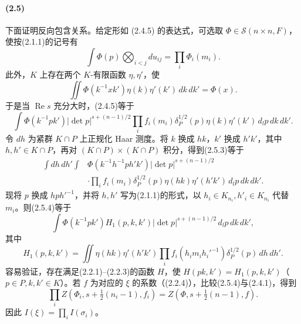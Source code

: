 \paragraph*{(2.5)} 下面证明反向包含关系。给定形如 (2.4.5) 的表达式，可选取 $\Phi\in\mathcal S(n\times n,F)$，使按(2.1.1)的记号有
\begin{equation}
 \int\Phi(p)\bigotimes_{i<j}du_{ij}=\prod_i\Phi_i(m_i).\tag{2.5.1}
\end{equation}
此外，$K$ 上存在两个 $K$-有限函数 $\eta,\eta'$，使
\begin{equation}
 \iint\Phi(k^{-1}xk')\eta(k)\eta'(k')\,dk\,dk'=\Phi(x).\tag{2.5.2}
\end{equation}
于是当 $\operatorname{Re}s$ 充分大时，(2.4.5)等于
\begin{equation}
 \int\Phi(k^{-1}pk')|\det p|^{s+(n-1)/2}
 \prod_if_i(m_i)\delta_P^{1/2}(p)\eta(k)\eta'(k')\,d_lp\,dk\,dk'.\tag{2.5.3}
\end{equation}
令 $dh$ 为紧群 $K\cap P$ 上正规化 Haar 测度。将 $k$ 换成 $hk$，$k'$ 换成 $h'k'$，其中 $h,h'\in K\cap P$，再对 $(K\cap P)\times(K\cap P)$ 积分，得到(2.5.3)等于
\begin{equation}
\begin{aligned}
 \int dh\,dh'\int&\Phi(k^{-1}h^{-1}ph'k')|\det p|^{s+(n-1)/2}\\
 &\cdot\prod_i f_i(m_i)\delta_P^{1/2}(p)\eta(hk)\eta'(h'k')\,d_lp\,dk\,dk'.
\end{aligned}\tag{2.5.4}
\end{equation}
现将 $p$ 换成 $hph'^{-1}$，并将 $h,h'$ 写为(2.1.1)的形式，以 $h_i\in K_{n_i},h'_i\in K_{n_i}$ 代替 $m_i$。则(2.5.4)等于
\begin{equation}
 \int\Phi(k^{-1}pk')H_1(p,k,k')|\det p|^{s+(n-1)/2}\,d_lp\,dk\,dk',\tag{2.5.5}
\end{equation}
其中
\[
 H_1(p,k,k')=\iint\eta(hk)\eta'(h'k')\prod_i f_i(h_im_ih_i'^{-1})\delta_P^{1/2}(p)\,dh\,dh'.
\]
容易验证，存在满足(2.2.1)--(2.2.3)的函数 $H$，使 $H(pk,k')=H_1(p,k,k')$（$p\in P,k,k'\in K$）。若 $f$ 为对应的 $\xi$ 的系数（(2.2.4)），比较(2.5.4)与(2.4.1)，得到
\[
 \prod_i Z(\Phi_i,s+\tfrac12(n_i-1),f_i)=Z(\Phi,s+\tfrac12(n-1),f).
\]
因此 $I(\xi)=\prod_iI(\sigma_i)$。

